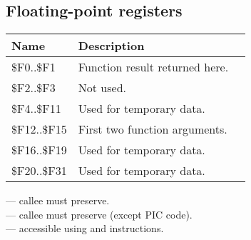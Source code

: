 \subsection{Floating-point registers}
\label{MIPS_FPU_registers}

\begin{center}
\begin{tabular}{ | l | l | l | }
\hline
\cellcolor{blue!25} Name & \cellcolor{blue!25} Description \\
\hline
\$F0..\$F1   & Function result returned here. \\
\hline
\$F2..\$F3   & Not used. \\
\hline
\$F4..\$F11  & Used for temporary data. \\
\hline
\$F12..\$F15 & First two function arguments. \\
\hline
\$F16..\$F19 & Used for temporary data. \\
\hline
\$F20..\$F31 & Used for temporary data\AsteriskOne{}. \\
\hline
\end{tabular}
\end{center}

\AsteriskOne{} --- \Gls{callee} must preserve.\\
\AsteriskTwo{} --- \Gls{callee} must preserve (except \ac{PIC} code).\\
\AsteriskThree{} --- accessible using  and  instructions.\\

\fi
